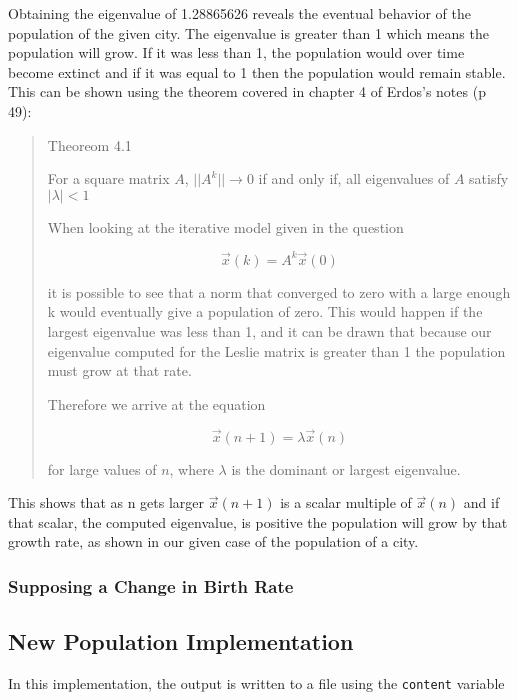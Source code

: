 \documentclass[letterpaper,12pt]{article}
\begin{document}
Obtaining the eigenvalue of 1.28865626 reveals the eventual behavior of the
population of the given city.
The eigenvalue is greater than 1 which means the population will grow.
If it was less than 1, the population would over time become extinct and if
it was equal to 1 then the population would remain stable.
This can be shown using the theorem covered in chapter 4 of Erdos's notes (p 49):

\begin{quote}
Theoreom 4.1

For a square matrix $A$,
$||A^k|| \to 0$ if and only if, all eigenvalues of $A$ satisfy $|\lambda| < 1$

When looking at the iterative model given in the question 

\[\vec{x}(k) = A^k \vec{x}(0)\]

it is possible to see that a norm that converged to zero with a large enough k would eventually give a population of zero.
This would happen if the largest eigenvalue was less than 1, and it can be drawn that because our eigenvalue computed for
the Leslie matrix is greater than 1 the population must grow at that rate.

Therefore we arrive at the equation

\[\vec{x}(n+1) = \lambda\vec{x}(n)\]

for large values of $n$, where $\lambda$ is the dominant or largest eigenvalue.
\end{quote}

This shows that as n gets larger $\vec{x}(n+1)$ is a scalar multiple of $\vec{x}(n)$ and if that scalar,
the computed eigenvalue, is positive the population will grow by that growth rate,
as shown in our given case of the population of a city.

\subsubsection{Supposing a Change in Birth Rate}

\subsection{New Population Implementation}
In this implementation, the output is written to a file using the \texttt{content} variable
\end{document}
